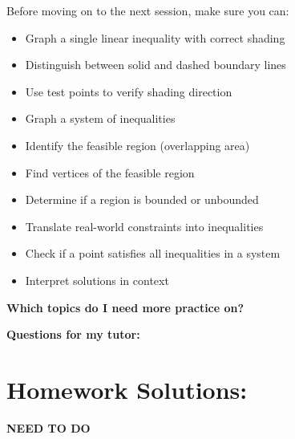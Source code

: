 \documentclass[12pt]{article}
\begin{document}
        Before moving on to the next session, make sure you can:
	    \begin{itemize}
		    \item Graph a single linear inequality with correct shading
    		\item Distinguish between solid and dashed boundary lines
	    	\item Use test points to verify shading direction
		    \item Graph a system of inequalities
	    	\item Identify the feasible region (overlapping area)
		    \item Find vertices of the feasible region
		    \item Determine if a region is bounded or unbounded
	    	\item Translate real-world constraints into inequalities
	    	\item Check if a point satisfies all inequalities in a system
	    	\item Interpret solutions in context
	    \end{itemize}
	
	    \textbf{Which topics do I need more practice on?}
	
        \vspace{4cm}
	
	    \textbf{Questions for my tutor:}

        \newpage

    \section*{Homework Solutions:}

        \textbf{NEED TO DO}
	
\end{document}
